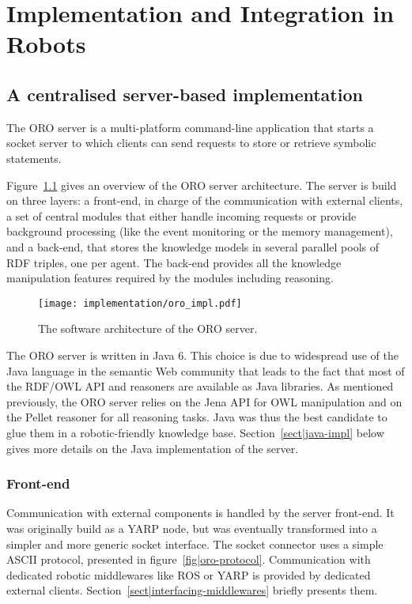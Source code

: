 \chapter{Implementation and Integration in Robots}
\label{chapt|implementation-integration}

\section{A centralised server-based implementation}
\label{sect|oro-server-impl}

The ORO server is a multi-platform command-line application that starts a
socket server to which clients can send requests to store or retrieve symbolic
statements.

Figure~\ref{fig|oro-impl} gives an overview of the ORO server architecture. The
server is build on three layers: a front-end, in charge of the communication
with external clients, a set of central modules that either handle incoming
requests or provide background processing (like the event monitoring or the
memory management), and a back-end, that stores the knowledge models in several
parallel pools of RDF triples, one per agent. The back-end provides all the
knowledge manipulation features required by the modules including
reasoning.

\begin{figure}
    \centering
    \texttt{[image: implementation/oro\_impl.pdf]}
    \caption{The software architecture of the ORO server.}
    \label{fig|oro-impl}
\end{figure}


The ORO server is written in Java 6. This choice is due to widespread use of
the Java language in the semantic Web community that leads to the fact that
most of the RDF/OWL API and reasoners are available as Java libraries. As
mentioned previously, the ORO server relies on the Jena API for OWL
manipulation and on the Pellet reasoner for all reasoning tasks. Java was thus
the best candidate to glue them in a robotic-friendly knowledge base.
Section~\ref{sect|java-impl} below gives more details on the Java
implementation of the server.

\subsection{Front-end}
\label{sect|frontend}

Communication with external components is handled by the server front-end.  It
was originally build as a YARP node, but was eventually transformed into a
simpler and more generic socket interface.  The socket connector uses a simple
ASCII protocol, presented in figure~\ref{fig|oro-protocol}.  Communication with
dedicated robotic middlewares like ROS or YARP is provided by dedicated
external clients. Section~\ref{sect|interfacing-middlewares} briefly presents
them.



